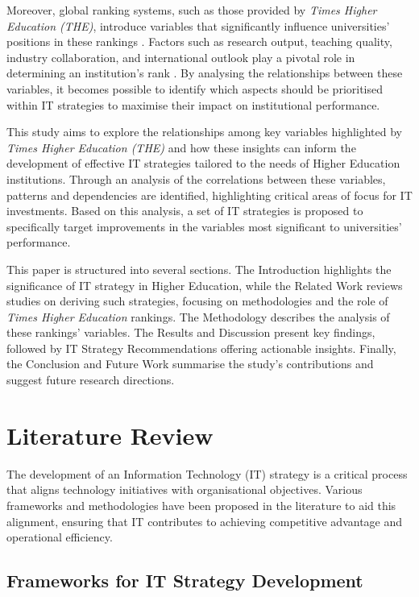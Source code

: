 \documentclass[conference]{IEEEtran}
\begin{document}
Moreover, global ranking systems, such as those provided by \textit{Times Higher Education (THE)}, introduce variables that significantly influence universities' positions in these rankings \cite{times2023methodology}. Factors such as research output, teaching quality, industry collaboration, and international outlook play a pivotal role in determining an institution’s rank \cite{times2022rankings}. By analysing the relationships between these variables, it becomes possible to identify which aspects should be prioritised within IT strategies to maximise their impact on institutional performance.



This study aims to explore the relationships among key variables highlighted by \textit{Times Higher Education (THE)} and how these insights can inform the development of effective IT strategies tailored to the needs of Higher Education institutions. Through an analysis of the correlations between these variables, patterns and dependencies are identified, highlighting critical areas of focus for IT investments. Based on this analysis, a set of IT strategies is proposed to specifically target improvements in the variables most significant to universities' performance.

This paper is structured into several sections. The Introduction highlights the significance of IT strategy in Higher Education, while the Related Work reviews studies on deriving such strategies, focusing on methodologies and the role of \textit{Times Higher Education} rankings. The Methodology describes the analysis of these rankings' variables. The Results and Discussion present key findings, followed by IT Strategy Recommendations offering actionable insights. Finally, the Conclusion and Future Work summarise the study's contributions and suggest future research directions.


\section{Literature Review}
\label{sec:literature_review}

The development of an Information Technology (IT) strategy is a critical process that aligns technology initiatives with organisational objectives. Various frameworks and methodologies have been proposed in the literature to aid this alignment, ensuring that IT contributes to achieving competitive advantage and operational efficiency.

\subsection{Frameworks for IT Strategy Development}
\end{document}
